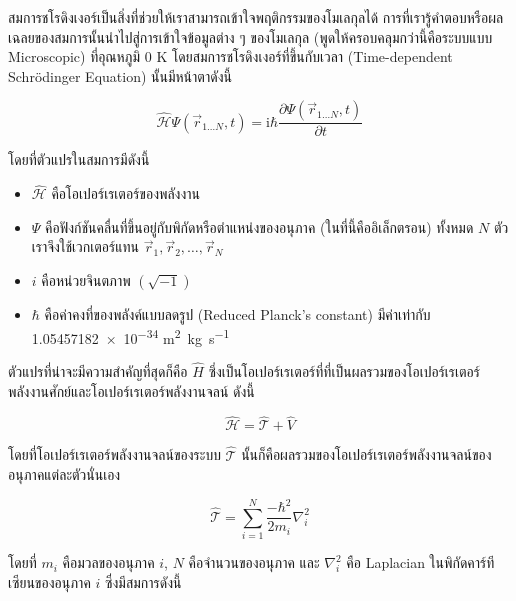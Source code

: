 สมการชโรดิงเงอร์เป็นสิ่งที่ช่วยให้เราสามารถเข้าใจพฤติกรรมของโมเลกุลได้ การที่เรารู้คำตอบหรือผลเฉลยของสมการนั้นนำไปสู่การเข้าใจข้อมูลต่าง ๆ
ของโมเลกุล (พูดให้ครอบคลุมกว่านี้คือระบบแบบ Microscopic) ที่อุณหภูมิ 0 K โดยสมการชโรดิงเงอร์ที่ขึ้นกับเวลา (Time-dependent
Schr\"{o}dinger Equation) นั้นมีหน้าตาดังนี้

\begin{equation}
    \label{eq:time_dependent_schrodinger}
    \hat{\mathscr{H}} \Psi\left(\vec{r}_{1 \ldots N}, t\right)
    =
    \mathrm{i} \hbar
    \frac
    {
        \partial \Psi\left(\vec{r}_{1 \ldots N}, t\right)
    }
    {
        \partial t
    }
\end{equation}

\noindent โดยที่ตัวแปรในสมการมีดังนี้
\begin{itemize}[topsep=0pt,noitemsep]
    \setlength\itemsep{1em}
    \item $\hat{\mathscr{H}}$ คือโอเปอร์เรเตอร์ของพลังงาน

    \item $\Psi$ คือฟังก์ชันคลื่นที่ขึ้นอยู่กับพิกัดหรือตำแหน่งของอนุภาค (ในที่นี้คืออิเล็กตรอน) ทั้งหมด $N$ ตัว เราจึงใช้เวกเตอร์แทน
          $\vec{r}_{1}, \vec{r}_{2}, \dots, \vec{r}_{N}$

    \item $i$ คือหน่วยจินตภาพ $(\sqrt{-1})$

    \item $\hbar$ คือค่าคงที่ของพลังค์แบบลดรูป (Reduced Planck's constant) มีค่าเท่ากับ
          \num{1.05457182e-34} \si{m^{2}.kg.s^{-1}}
\end{itemize}

ตัวแปรที่น่าจะมีความสำคัญที่สุดก็คือ $\hat{H}$ ซึ่งเป็นโอเปอร์เรเตอร์ที่ที่เป็นผลรวมของโอเปอร์เรเตอร์พลังงานศักย์และโอเปอร์เรเตอร์พลังงานจลน์
ดังนี้

\begin{equation}
    \label{eq:hamiltonian_operator}
    \hat{\mathscr{H}} = \hat{\mathscr{T}}+\hat{V}
\end{equation}

\noindent โดยที่โอเปอร์เรเตอร์พลังงานจลน์ของระบบ $\hat{\mathscr{T}}$ นั้นก็คือผลรวมของโอเปอร์เรเตอร์พลังงานจลน์ของอนุภาคแต่ละตัวนั่นเอง

\begin{equation}
    \label{eq:kinetic_operator}
    \hat{\mathscr{T}} = \sum_{i=1}^N \frac{-\hbar^2}{2 m_i} \nabla_i^2
\end{equation}

\noindent โดยที่ $m_i$ คือมวลของอนุภาค $i$, $N$ คือจำนวนของอนุภาค และ $\nabla_i^2$ คือ Laplacian ในพิกัดคาร์ทีเซียนของอนุภาค
$i$ ซึ่งมีสมการดังนี้

